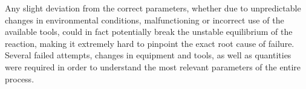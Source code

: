\documentclass{article}
\begin{document}
        Any slight deviation from the correct parameters, whether due to 
        unpredictable changes in environmental conditions, malfunctioning or incorrect use of the available tools, could 
        in fact potentially break the unstable equilibrium of the reaction, making it extremely 
        hard to pinpoint the exact root cause of failure. \\  

        Several failed attempts, changes in equipment and tools, as well as quantities were required in order 
        to understand the most relevant parameters of the entire process. 
        \clearpage
%
%
\end{document}
